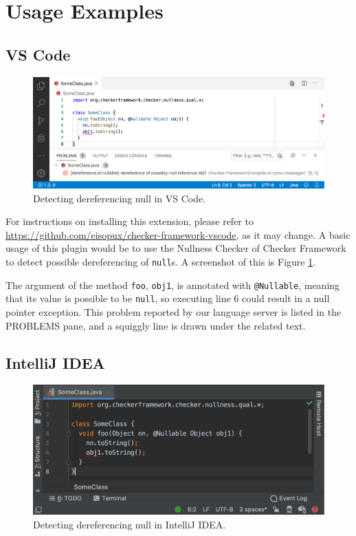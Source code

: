 \documentclass{article}
\begin{document}
\section{Usage Examples}

\subsection{VS Code}

\begin{figure}[ht]
\centering
\includegraphics[scale=0.5]{demo-vscode.png}
\caption{Detecting dereferencing null in VS Code.}
\label{fig:demo-vscode}
\end{figure}

For instructions on installing this extension, please refer to \url{https://github.com/eisopux/checker-framework-vscode}, as it may change. A basic usage of this plugin would be to use the Nullness Checker of Checker Framework to detect possible dereferencing of \verb|null|s. A screenshot of this is Figure \ref{fig:demo-vscode}.

The argument of the method \verb|foo|, \verb|obj1|, is annotated with \verb|@Nullable|, meaning that its value is possible to be \verb|null|, so executing line 6 could result in a null pointer exception. This problem reported by our language server is listed in the PROBLEMS pane, and a squiggly line is drawn under the related text.


\subsection{IntelliJ IDEA}

\begin{figure}[ht]
\centering
\includegraphics[scale=0.6]{demo-idea.png}
\caption{Detecting dereferencing null in IntelliJ IDEA.}
\label{fig:demo-idea}
\end{figure}
\end{document}
